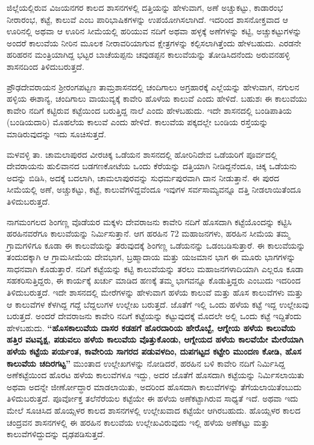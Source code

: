ಜಿಲ್ಲೆಯಲ್ಲಿರುವ ವಿಜಯನಗರ ಕಾಲದ ಶಾಸನಗಳಲ್ಲಿ ದತ್ತಿಯನ್ನು ಹೇಳುವಾಗ, ಅಣೆ ಅಚ್ಚುಕಟ್ಟು, ಕಾಡಾರಂಭ ನೀರಾರಂಭ, ಕಟ್ಟೆ, ಕಾಲುವೆ ಎಂಬ ಪಾರಿಭಾಷಿಕಗಳನ್ನು ಉಪಯೋಗಿಸಲಾಗಿದೆ. ಇದರಿಂದ ಶಾಸನೋಕ್ತವಾದ ಆ ಊರಿನಲ್ಲಿ ಅಥವಾ ಆ ಊರಿನ ಸೀಮೆಯಲ್ಲಿ ಹರಿಯುವ ನದಿಗೆ ಅಥವಾ ಹಳ್ಳಕ್ಕೆ ಅಣೆಗಳನ್ನು ಕಟ್ಟಿ, ಅಚ್ಚುಕಟ್ಟುಗಳನ್ನು ಅಂದರೆ ಕಾಲುವೆಯ ನೀರಿನ ಮೂಲಕ ನೀರಾವರಿಯಾಗುವ ಕ್ಷೇತ್ರಗಳನ್ನು ಕಲ್ಪಿಸಲಾಗಿತ್ತೆಂದು ಹೇಳಬಹುದು. ಎರಡನೇ ಹರಿಹರನ ಮಂತ್ರಿಯಾಗಿದ್ದ ಭಟ್ಟರ ಬಾಚೆಯಪ್ಪನು ಚವುಡಪ್ಪನ ಕಾಲುವೆಯನ್ನು ತೋಡಿಸಿದನೆಂದು ಅರುವನಹಳ್ಳಿ ಶಾಸನದಿಂದ ತಿಳಿದುಬರುತ್ತದೆ.

ಪ್ರೌಢದೇವರಾಯನ ಶ‍್ರೀರಂಗಪಟ್ಟಣ ತಾಮ್ರಶಾಸನದಲ್ಲಿ ಚಂದಿಗಾಲು ಅಗ್ರಹಾರಕ್ಕೆ ಎಲ್ಲೆಯನ್ನು ಹೇಳುವಾಗ, ನಗುಲನ ಹಳ್ಳಿಯ ಈಶಾನ್ಯ, ಚಂದಿಗಾಲು ವಾಯುವ್ಯಕ್ಕೆ ಕಾವೇರಿ ಹೊಳೆಯ ಕಾಲುವೆ ಎಂದು ಹೇಳಿದೆ. ಬಹುಶಃ ಈ ಕಾಲುವೆಯು ಕಾವೇರಿ ನದಿಗೆ ಕಟ್ಟಿರುವ ಕಟ್ಟೆಯಿಂದ ಬರುತ್ತಿದ್ದ ನಾಲೆ ಎಂದು ಹೇಳಬಹುದು. ಇದೇ ಶಾಸನದಲ್ಲಿ ಬಂಡಿಪಾತಿಯ (ಬಂಡಿಯದಾರಿ) ಮೊಹಲೆಯ ಕಾಲುವೆ ಎಂದು ಹೇಳಿದೆ. ಕಾಲುವೆಯ ಪಕ್ಕದಲ್ಲೇ ಬಂಡಿಯ ರಸ್ತೆಯನ್ನು ಮಾಡಿರುವುದನ್ನು ಇದು ಸೂಚಿಸುತ್ತದೆ.

ಮಳವಳ್ಳಿ ತಾ. ಚಾಮಲಾಪುರದ ವೀರಚಿಕ್ಕ ಒಡೆಯನ ಶಾಸನದಲ್ಲಿ ಹೋರಿನಿದೇವ ಒಡೆಯರಿಗೆ ಪೂರ್ವದಲ್ಲಿ ದೇವರಾಯನು ಹುಲಿವಾನದ ಬಡಗಣಕೋಟೆಯ ಒಂದು ಕೆರೆಯನ್ನು ದತ್ತಿಯಾಗಿ ನೀಡಿದ್ದನೆಂದೂ, ಚಿಕ್ಕ ಒಡೆಯನು ಅದನ್ನು ಬಿಡಿಸಿ, ಅದಕ್ಕೆ ಬದಲಾಗಿ, ಚಾಮಲಾಪುರವನ್ನು ಸುಧರ್ಮಪುರವಾಗಿ ದಾನ ನೀಡುತ್ತಾನೆ. ಈ ಪುರದ ಸೀಮೆಯಲ್ಲಿ ಅಣೆ, ಅಚ್ಚುಕಟ್ಟು, ಕಟ್ಟೆ, ಕಾಲುವೆಗಳಿದ್ದವೆಂದೂ ಇವುಗಳ ಸರ್ವಸಾಮ್ಯವನ್ನೂ ದತ್ತಿ ನೀಡಲಾಯಿತೆಂದೂ ತಿಳಿದುಬರುತ್ತದೆ.

ನಾಗಮಂಗಲದ ಶಿಂಗಣ್ಣ ವೊಡೆಯರ ಮಕ್ಕಳು ದೇವರಾಜನು ಕಾವೇರಿ ನದಿಗೆ ಹೊಸದಾಗಿ ಕಟ್ಟೆಯೊಂದನ್ನು ಕಟ್ಟಿಸಿ ಹರಹಿನವರೆಗೂ ಕಾಲುವೆಯನ್ನು ನಿರ್ಮಿಸುತ್ತಾನೆ. ಆಗ ಹರಹಿನ 72 ಮಹಾಜನಗಳು, ಹರಹಿನ ಸೀಮೆಯ ತಮ್ಮ ಗ್ರಾಮಗಳಿಗೂ ಕೂಡಾ ಈ ಕಾಲುವೆಯನ್ನು ತರುವುದಕ್ಕೆ ಶಿಂಗಣ್ಣ ಒಡೆಯನನ್ನು ಒಡಂಬಡಿಸುತ್ತಾರೆ. ಈ ಕಾಲುವೆಯನ್ನು ತಂದುದಕ್ಕಾಗಿ ಆ ಗ್ರಾಮಸೀಮೆಯ ದೇವಭಾಗ, ಬ್ರಹ್ಮಾದಾಯ ಮತ್ತು ಯಜಮಾನ ಭಾಗ ಈ ಮೂರು ಭಾಗಗಳನ್ನು ಸಾಧನವಾಗಿ ಕೊಡುತ್ತಾರೆ. ನದಿಗೆ ಕಟ್ಟೆಯನ್ನು ಕಟ್ಟಿ ಕಾಲುವೆಯನ್ನು ತರಲು ಮಹಾಜನಗಳಾದಿಯಾಗಿ ಎಲ್ಲರೂ ಕೂಡಾ ಸಹಕರಿಸುತ್ತಿದ್ದರು, ಈ ಕಾರ್ಯಕ್ಕೆ ಖರ್ಚು ಮಾಡಿದ ಹಣಕ್ಕೆ ತಮ್ಮ ಭಾಗವನ್ನೂ ಕೊಡುತ್ತಿದ್ದರು ಎಂಬುದು ಇದರಿಂದ ತಿಳಿದುಬರುತ್ತದೆ. ಇದೇ ಶಾಸನದಲ್ಲಿ ಮೇರೆಗಳನ್ನು ಹೇಳುವಾಗ ಹಳೆಯ ಕಾಲುವೆ ಮತ್ತು ಹೊಸ ಕಾಲುವೆಗಳು ಮತ್ತು ಆ ಕಾಲುವೆಗಳ ಕೆಳಗಿದ್ದ ಗದ್ದೆ ಬೆದ್ದಲುಗಳ ಉಲ್ಲೇಖ ಬರುತ್ತದೆ. ಜೊತೆಗೆ ಇಲ್ಲಿ ಒಂದು ಹಳೆಯ ಕಟ್ಟೆ ಇದ್ದ ಉಲ್ಲೇಖವು ಬರುತ್ತದೆ. ಅಂದರೆ ದೇವರಾಜನು ಕಾವೇರಿ ನದಿಗೆ ಕಟ್ಟೆಯನ್ನು ಕಟ್ಟುವುದಕ್ಕೆ ಮೊದಲೇ ಅಲ್ಲಿ ಒಂದು ಕಟ್ಟೆ ಇದ್ದಿತೆಂದು ಹೇಳಬಹುದು. \textbf{“ಹೊಸಕಾಲುವೆಯ ದಾಸರ ಕಡಹಗೆ ಹೊರದಾರಿಯ ಹೇರೊಬ್ಬೆ, ಆಗ್ನೇಯ ಹಳೆಯ ಕಾಲುವೆಯ ಹತ್ತಿರ ವಟವೃಕ್ಷ, ಪಡುವಲು ಹಳೆಯ ಕಾಲುವೆಯ ವೊತ್ತುಕೊಂಡು, ಆಗ್ನೇಯದ ಹಳೆಯ ಕಾಲವೆಯೇ ಮೇರೆಯಾಗಿ ಹಳೆಯ ಕಟ್ಟೆಯ ಪರ್ಯಂತ, ಕಾವೇರಿಯ ಸಾಗರದ ಪಡುವಳದಿಂ, ದುಪಗಟ್ಟದ ಕಟ್ಟೇರಿ ಮುಂದಣ ಕೋಡಿ, ಹೊಸ ಕಾಲುವೆಯ ಚದಿರಗಟ್ಟ”} ಮುಂತಾದ ಉಲ್ಲೇಖಗಳನ್ನು ನೋಡಿದರೆ, ಹರಹಿನ ಬಳಿ ಕಾವೇರಿ ನದಿಗೆ ನಿರ್ಮಿಸಿದ್ದ ಅಣೆಕಟ್ಟೆಯಿಂದ ಹೊರಟ ಹಳೆಯ ಕಾಲುವೆಗಳೂ ಇದ್ದು, ಅದರ ಜೊತೆಗೆ ಹೊಸದಾಗಿ ಕಟ್ಟೆಯನ್ನು ನಿರ್ಮಿಸಲಾಯಿತು ಅಥವಾ ಅದನ್ನೇ ಜೀರ್ಣೋದ್ಧಾರ ಮಾಡಲಾಯಿತು, ಅದರಿಂದ ಹೊಸದಾಗಿ ಕಾಲುವೆಗಳನ್ನು ತೆಗೆಯಲಾಯಿತೆಂಬುದು ತಿಳಿದುಬರುತ್ತದೆ. ಪೂರ್ವೋಕ್ತ ತಲೆನೆರೆಯಲ ಕಟ್ಟೆಯೇ ಈ ಹಳೆಯ ಅಣೆಕಟ್ಟಾಗಿರುವ ಸಾಧ್ಯತೆ ಇದೆ. ಅಥವಾ ಇದು ಮೇಲೆ ಸೂಚಿಸಿದ ಹೊಯ್ಸಳರ ಕಾಲದ ಶಾಸನಗಳಲ್ಲಿ ಉಲ್ಲೇಖವಾದ ಕಟ್ಟೆಯೇ ಆಗಿರಬಹುದು. ಹೊಯ್ಸಳರ ಕಾಲದ ಚಂದ್ರವನ ಶಾಸನಗಳಲ್ಲಿ ಈ ಹರಹಿನ ಕಾಲುವೆಯ ಉಲ್ಲೇಖವಿರುವುದು ಇಲ್ಲಿ ಹಳೆಯ ಅಣೆಕಟ್ಟು ಮತ್ತು ಕಾಲುವೆಗಳಿದ್ದುದನ್ನು ದೃಢಪಡಿಸುತ್ತದೆ.

